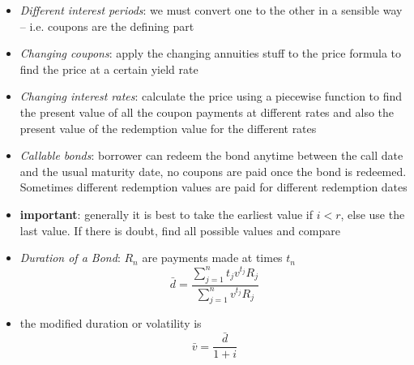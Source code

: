 \documentclass[../00_main.tex]{subfiles}
\begin{document}
\begin{itemize}
    \item \textit{Different interest periods}: we must convert one to the other
        in a sensible way -- i.e. coupons are the defining part
    \item \textit{Changing coupons}: apply the changing annuities stuff to the
        price formula to find the price at a certain yield rate
    \item \textit{Changing interest rates}: calculate the price using
        a piecewise function to find the present value of all the coupon
        payments at different rates and also the present value of the
        redemption value for the different rates
    \item \textit{Callable bonds}: borrower can redeem the bond anytime
        between the call date and the usual maturity date, no coupons are paid
        once the bond is redeemed. Sometimes different redemption values are
        paid for different redemption dates
    \item \textbf{important}: generally it is best to take the earliest value
        if $i < r$, else use the last value. If there is doubt, find all 
        possible values and compare
    \item \textit{Duration of a Bond}: $R_n$ are payments made at times $t_n$
        \begin{equation}\nonumber
            \bar d = \frac{\sum_{j=1}^n t_j v^{t_j} R_j}{\sum_{j=1}^n v^{t_j} R_j}
        \end{equation}
    \item the modified duration or volatility is 
        \begin{equation}\nonumber
            \bar v = \frac{\bar d}{1 + i}
        \end{equation}
\end{itemize}
\end{document}

